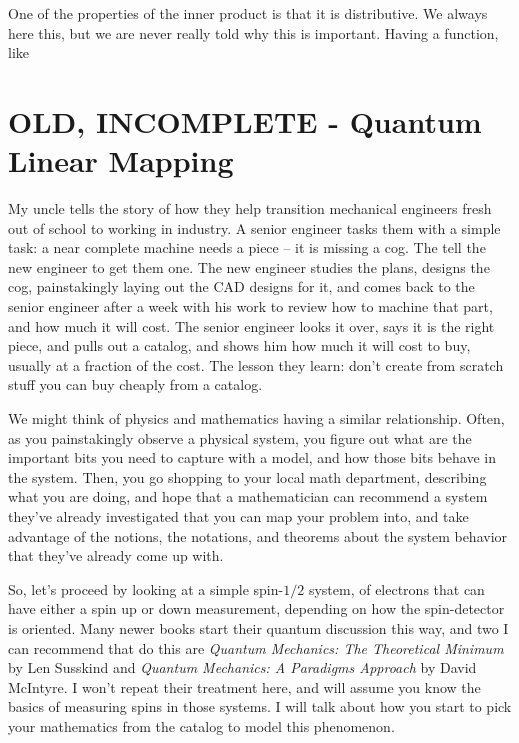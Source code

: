 \documentclass[
]{book}
\begin{document}
One of the properties of the inner product is that it is distributive. We always here this, but we are never really told why this is important. Having a function, like

\hypertarget{old-incomplete---quantum-linear-mapping}{%
\chapter{OLD, INCOMPLETE - Quantum Linear Mapping}\label{old-incomplete---quantum-linear-mapping}}

My uncle tells the story of how they help transition mechanical engineers fresh out of school to working in industry. A senior engineer tasks them with a simple task: a near complete machine needs a piece -- it is missing a cog. The tell the new engineer to get them one. The new engineer studies the plans, designs the cog, painstakingly laying out the CAD designs for it, and comes back to the senior engineer after a week with his work to review how to machine that part, and how much it will cost. The senior engineer looks it over, says it is the right piece, and pulls out a catalog, and shows him how much it will cost to buy, usually at a fraction of the cost. The lesson they learn: don't create from scratch stuff you can buy cheaply from a catalog.

We might think of physics and mathematics having a similar relationship. Often, as you painstakingly observe a physical system, you figure out what are the important bits you need to capture with a model, and how those bits behave in the system. Then, you go shopping to your local math department, describing what you are doing, and hope that a mathematician can recommend a system they've already investigated that you can map your problem into, and take advantage of the notions, the notations, and theorems about the system behavior that they've already come up with.

So, let's proceed by looking at a simple spin-\(1/2\) system, of electrons that can have either a spin up or down measurement, depending on how the spin-detector is oriented. Many newer books start their quantum discussion this way, and two I can recommend that do this are \emph{Quantum Mechanics: The Theoretical Minimum} by Len Susskind and \emph{Quantum Mechanics: A Paradigms Approach} by David McIntyre. I won't repeat their treatment here, and will assume you know the basics of measuring spins in those systems. I will talk about how you start to pick your mathematics from the catalog to model this phenomenon.
\end{document}
